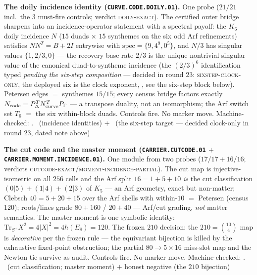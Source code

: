 \documentclass[11pt,a4paper]{article}
\theoremstyle{definition}
\begin{document}
\par\smallskip\noindent\textbf{The doily incidence identity
(\texttt{CURVE.CODE.DOILY.01}).}
One probe ($21/21$ incl.\ the $3$ must-fire controls; verdict
\textsc{doily-exact}).  The certified outer bridge sharpens into an
incidence-operator statement with a spectral payoff: the $K_6$
doily incidence $N$ ($15$ duads $\times$ $15$ synthemes on the six
odd Arf refinements) satisfies $NN^{T}=B+2I$ entrywise with
$\mathrm{spec}=\{9,4^9,0^5\}$, and $N/3$ has singular values
$\{1,2/3,0\}$ --- the recovery base rate $2/3$ is the unique
nontrivial singular value of the canonical duad-to-syntheme
incidence (the $(2/3)^6$ identification typed \emph{pending the
six-step composition} --- decided in round 23:
\textsc{sixstep-clock-only}, the deployed six is the clock
exponent, , see the
six-step block below).  Petersen edges $=$ synthemes $15/15$;
every census bridge factors exactly
$N_{\rm code}=P_\Delta^{T}N_{\rm curve}^{T}P_\Gamma$ --- a
transpose duality, not an isomorphism; the Arf switch set $T_6$
$=$ the six within-block duads.  Controls fire.  No marker move.
Machine-checked: .
\mE\ (incidence identities) $+$ \mO\ (the six-step target ---
decided clock-only in round 23, dated note above)
\par\smallskip

\par\smallskip\noindent\textbf{The cut code and the master moment
(\texttt{CARRIER.CUTCODE.01} $+$
\texttt{CARRIER.MOMENT.INCIDENCE.01}).}
One module from two probes ($17/17+16/16$; verdicts
\textsc{cutcode-exact}/\textsc{moment-incidence-partial}).  The cut
map is injective-isometric on all $256$ cells and the Arf split
$16=1+\bar5+10$ \emph{is} the cut classification $(0|5)+(1|4)+(2|3)$
of $K_5$ --- an Arf geometry, exact but non-matter; Clebsch
$40=5+20+15$ over the Arf shells with within-$10$ $=$ Petersen
(census $120$); roots/lines grade $80+160$ / $20+40$ --- Arf/cut
grading, \emph{not} matter semantics.  The master moment is one
symbolic identity: $\mathrm{Tr}_{S^{+}}X^2=4|X|^2=4h(E_8)=120$.
The frozen $210$ decision: the $210=\binom{10}{4}$ map is
\emph{decorative} per the frozen rule --- the equivariant bijection
is killed by the exhaustive fixed-point obstruction; the partial
$80\to5\times16$ miss-slot map and the Newton tie survive as
audit.  Controls fire.  No marker move.
Machine-checked: .
\mE\ (cut classification; master moment) $+$ honest negative
(the $210$ bijection)
\par\smallskip
\end{document}
